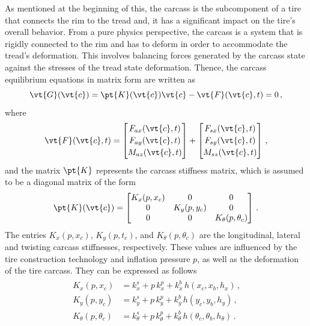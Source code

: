 As mentioned at the beginning of this, the carcass is the subcomponent of a tire that connects the rim to the tread and, it has a significant impact on the tire's overall behavior. From a pure physics perspective, the carcass is a system that is rigidly connected to the rim and has to deform in order to accommodate the tread's deformation. This involves balancing forces generated by the carcass state against the stresses of the tread state deformation. Thence, the carcass equilibrium equations in matrix form are written as
%
\begin{equation}
  \vt{G}(\vt{c}) = \pt{K}(\vt{c}) \vt{c} - \vt{F}(\vt{c},t) = 0 \, \text{,}
  \label{app3:eq:nls}
\end{equation}
%
where
%
\begin{equation*}
  \vt{F}(\vt{c},t) =
  \begin{bmatrix}
    F_{ax}(\vt{c},t) \\[0.2em]
    F_{ay}(\vt{c},t) \\[0.2em]
    M_{az}(\vt{c},t)
  \end{bmatrix} + \begin{bmatrix}
    F_{sx}(\vt{c},t) \\[0.2em]
    F_{sy}(\vt{c},t) \\[0.2em]
    M_{sz}(\vt{c},t)
  \end{bmatrix} \, \text{,}
\end{equation*}
%
and the matrix $\pt{K}$ represents the carcass stiffness matrix, which is assumed to be a diagonal matrix of the form
%
\begin{equation*}
  \pt{K}(\vt{c}) =
  \begin{bmatrix}
    K_x(p,x_c) & 0 & 0 \\
    0 & K_y(p,y_c) & 0 \\
    0 & 0 & K_\theta(p,\theta_c)
  \end{bmatrix} \, \text{.}
\end{equation*}
%
The entries $K_x(p,x_c)$, $K_y(p,t_c)$, and $K_\theta(p,\theta_c)$ are the longitudinal, lateral and twisting carcass stiffnesses, respectively. These values are influenced by the tire construction technology and inflation pressure $p$, as well as the deformation of the tire carcass. They can be expressed as follows
%
\begin{equation*}
  \begin{split}
    \begin{aligned}
      K_x(p,x_c)           &= k_x^s      + p \, k_x^p      + k_x^b \, h(x_c, x_b, h_x) \, \text{,} \\
      K_y(p,y_c)           &= k_y^s      + p \, k_y^p      + k_y^b \, h(y_c, y_b, h_y) \, \text{,} \\
      K_\theta(p,\theta_c) &= k_\theta^s + p \, k_\theta^p + k_\theta^b \, h(\theta_c, \theta_b, h_\theta) \, \text{.} \\
    \end{aligned}
  \end{split}
\end{equation*}

